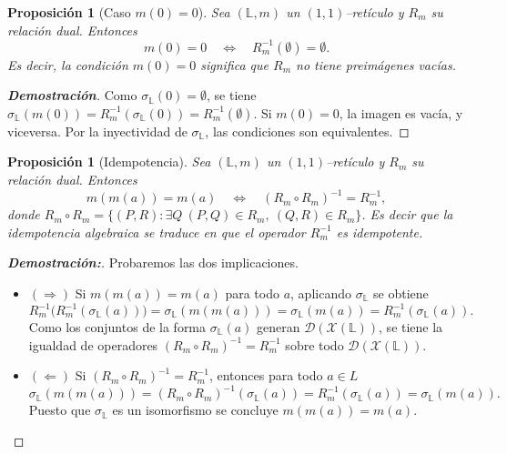 \documentclass[12pt]{book}
\newtheorem{proposition}[theorem]{Proposición}
\begin{document}
\begin{proposition}[Caso $m(0)=0$]
Sea $(\mathbb{L},m)$ un $(1,1)$–retículo y $R_m$ su relación dual. Entonces
\[
m(0)=0
\quad\Longleftrightarrow\quad
R_m^{-1}(\emptyset)=\emptyset.
\]
Es decir, la condición $m(0)=0$ significa que $R_m$ no tiene preimágenes vacías.
\end{proposition}

\begin{proof}[\textbf{Demostración}]
Como $\sigma_{\mathbb{L}}(0)=\emptyset$, se tiene
$\sigma_{\mathbb{L}}(m(0))=R_m^{-1}(\sigma_{\mathbb{L}}(0))=R_m^{-1}(\emptyset)$.
Si $m(0)=0$, la imagen es vacía, y viceversa.
Por la inyectividad de $\sigma_{\mathbb{L}}$, las condiciones son equivalentes.
\end{proof}

\begin{proposition}[Idempotencia]
Sea $(\mathbb{L},m)$ un $(1,1)$–retículo y $R_m$ su relación dual. Entonces
\[
m(m(a))=m(a)
\quad\Longleftrightarrow\quad
(R_m\circ R_m)^{-1}=R_m^{-1},
\]
donde $R_m\circ R_m=\{(P,R):\exists Q\ (P,Q)\in R_m,\ (Q,R)\in R_m\}$. Es decir que la idempotencia algebraica 
se traduce en que el operador $R_m^{-1}$ es idempotente.
\end{proposition}

\begin{proof}[{\textbf{Demostración:}}]Probaremos las dos implicaciones.

\begin{itemize}
    \item \((\Rightarrow)\) Si \(m(m(a))=m(a)\) para todo \(a\), aplicando \(\sigma_{\mathbb{L}}\) se obtiene
\[
R_m^{-1}\big(R_m^{-1}(\sigma_{\mathbb{L}}(a))\big)
=\sigma_{\mathbb{L}}(m(m(a)))
=\sigma_{\mathbb{L}}(m(a))
=R_m^{-1}(\sigma_{\mathbb{L}}(a)).
\]
Como los conjuntos de la forma \(\sigma_{\mathbb{L}}(a)\) generan \(\mathcal D(\mathcal{X}(\mathbb L))\),
se tiene la igualdad de operadores \((R_m\circ R_m)^{-1}=R_m^{-1}\) sobre todo
\(\mathcal D(\mathcal{X}(\mathbb L))\).

\item \((\Leftarrow)\) Si \((R_m\circ R_m)^{-1}=R_m^{-1}\), entonces para todo \(a\in L\)
\[
\sigma_{\mathbb{L}}(m(m(a)))= (R_m\circ R_m)^{-1}(\sigma_{\mathbb{L}}(a)) = R_m^{-1}(\sigma_{\mathbb{L}}(a)) = \sigma_{\mathbb{L}}(m(a)).
\]
Puesto que \(\sigma_{\mathbb{L}}\) es un isomorfismo se concluye \(m(m(a))=m(a)\).
\end{itemize}
\end{proof}
\end{document}
